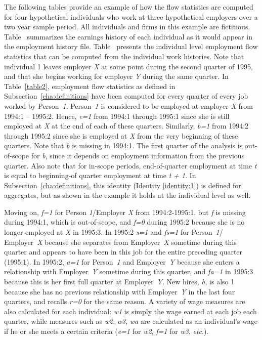 The following tables provide an example of how the flow statistics are
computed for four hypothetical individuals who work at three hypothetical
employers over a two year sample period. All individuals and firms in this
example are fictitious. Table~ summarizes the earnings history
 of each individual as it would appear in the
employment history file.  Table~ presents the
individual level employment flow statistics that can be computed from the
individual work histories. Note that individual 1 leaves employer
\textit{X} at some point during the second quarter of 1995, and that she
begins working for employer \textit{Y} during the same quarter. In
Table~\ref{table2}, employment flow statistics as defined in
Subsection~\ref{cha:definitions} have been computed for every quarter of every
job worked by Person~\textit{1}. Person~\textit{1} is considered to be
employed at employer \textit{X} from 1994:1 -- 1995:2.  Hence, \textit{e=1}
from 1994:1 through 1995:1 since she is still employed at \textit{X} at the
end of each of these quarters. Similarly, \textit{b=1} from 1994:2 through
1995:2 since she is employed at \textit{X} from the very beginning of these
quarters. Note that \textit{b} is missing in 1994:1. The first quarter of
the analysis is out-of-scope for \textit{b}, since it depends on employment
information from the previous quarter. Also note that for in-scope periods,
end-of-quarter employment at time
\textit{t} is equal to beginning-of quarter employment at time \textit{t +
  1}. In Subsection~\ref{cha:definitions}, this identity (Identity
\ref{identity:1}) is defined for aggregates, but as shown in the example it
holds at the individual level as well.



Moving on, \textit{f=1} for Person \textit{1}/Employer \textit{X} from
1994:2-1995:1, but \textit{f} is missing during 1994:1, which is
out-of-scope, and \textit{f=0} during 1995:2 because she is no longer
employed at \textit{X} in 1995:3. In 1995:2 \textit{s=1} and \textit{fs=1}
for Person~\textit{1}/ Employer~\textit{X} because she separates from
Employer~\textit{X} sometime during this quarter and appears to have been
in this job for the entire preceding quarter (1995:1).  In 1995:2,
\textit{a=1} for Person~\textit{1} and Employer~\textit{Y} because she
enters a relationship with Employer~\textit{Y} sometime during this
quarter, and \textit{fa=1} in 1995:3 because this is her first full quarter
 at Employer~\textit{Y}. New hires, \textit{h}, is also 1 because she has no previous relationship
with Employer~\textit{Y} in the last four quarters, and recalls
\textit{r=0} for the same reason. A variety of wage measures are also
calculated for each individual: \textit{w1} is simply the wage earned at
each job each quarter, while measures such as \textit{w2}, \textit{w3},
\textit{wa} are calculated as an individual's wage if he or she meets a
certain criteria (\textit{e=1} for \textit{w2}, \textit{f=1} for
\textit{w3}, \textit{etc}.).


